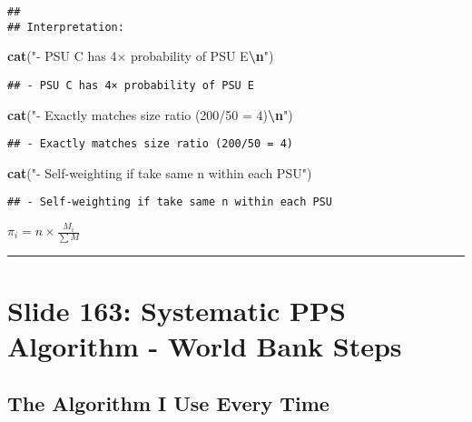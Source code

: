 \documentclass[
]{article}
\newenvironment{Shaded}{\begin{snugshade}}{\end{snugshade}}
\newcommand{\FunctionTok}[1]{\textcolor[rgb]{0.13,0.29,0.53}{\textbf{#1}}}
\newcommand{\NormalTok}[1]{#1}
\newcommand{\SpecialCharTok}[1]{\textcolor[rgb]{0.81,0.36,0.00}{\textbf{#1}}}
\newcommand{\StringTok}[1]{\textcolor[rgb]{0.31,0.60,0.02}{#1}}
\begin{document}
\begin{verbatim}
## 
## Interpretation:
\end{verbatim}

\begin{Shaded}
\begin{Highlighting}[]
\FunctionTok{cat}\NormalTok{(}\StringTok{"{-} PSU C has 4× probability of PSU E}\SpecialCharTok{\textbackslash{}n}\StringTok{"}\NormalTok{)}
\end{Highlighting}
\end{Shaded}

\begin{verbatim}
## - PSU C has 4× probability of PSU E
\end{verbatim}

\begin{Shaded}
\begin{Highlighting}[]
\FunctionTok{cat}\NormalTok{(}\StringTok{"{-} Exactly matches size ratio (200/50 = 4)}\SpecialCharTok{\textbackslash{}n}\StringTok{"}\NormalTok{)}
\end{Highlighting}
\end{Shaded}

\begin{verbatim}
## - Exactly matches size ratio (200/50 = 4)
\end{verbatim}

\begin{Shaded}
\begin{Highlighting}[]
\FunctionTok{cat}\NormalTok{(}\StringTok{"{-} Self{-}weighting if take same n within each PSU"}\NormalTok{)}
\end{Highlighting}
\end{Shaded}

\begin{verbatim}
## - Self-weighting if take same n within each PSU
\end{verbatim}

\(\pi_i = n \times \frac{M_i}{\sum M}\)

\begin{center}\rule{0.5\linewidth}{0.5pt}\end{center}

\section{Slide 163: Systematic PPS Algorithm - World Bank
Steps}\label{slide-163-systematic-pps-algorithm---world-bank-steps}

\subsection{The Algorithm I Use Every
Time}\label{the-algorithm-i-use-every-time}
\end{document}
